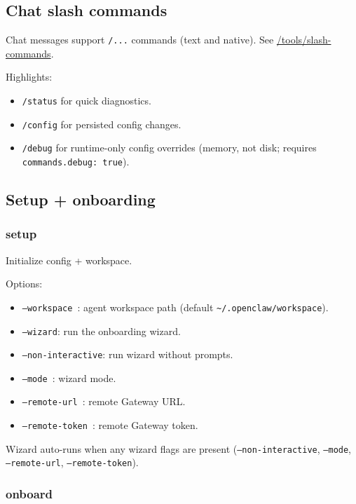\subsection{Chat slash commands}


Chat messages support \texttt{/...} commands (text and native). See \href{/tools/slash-commands}{/tools/slash-commands}.

Highlights:

\begin{itemize}
  \item \texttt{/status} for quick diagnostics.
  \item \texttt{/config} for persisted config changes.
  \item \texttt{/debug} for runtime-only config overrides (memory, not disk; requires \texttt{commands.debug: true}).
\end{itemize}


\subsection{Setup + onboarding}


\subsubsection{setup}


Initialize config + workspace.

Options:

\begin{itemize}
  \item \texttt{--workspace }: agent workspace path (default \texttt{\textasciitilde{}/.openclaw/workspace}).
  \item \texttt{--wizard}: run the onboarding wizard.
  \item \texttt{--non-interactive}: run wizard without prompts.
  \item \texttt{--mode }: wizard mode.
  \item \texttt{--remote-url }: remote Gateway URL.
  \item \texttt{--remote-token }: remote Gateway token.
\end{itemize}


Wizard auto-runs when any wizard flags are present (\texttt{--non-interactive}, \texttt{--mode}, \texttt{--remote-url}, \texttt{--remote-token}).

\subsubsection{onboard}



